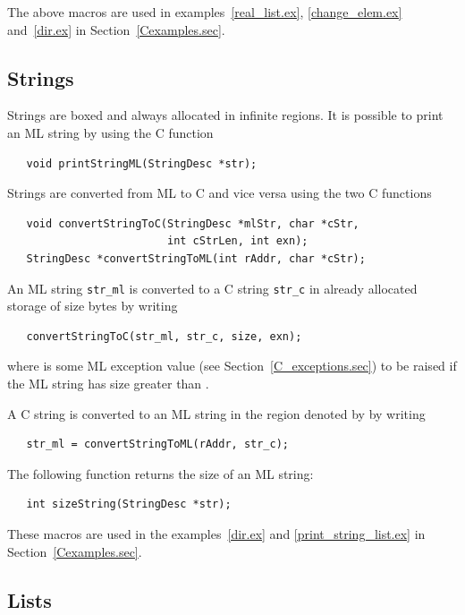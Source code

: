 \documentclass[12pt]{book}
\begin{document}
The above macros are used in examples~\ref{real_list.ex},
\ref{change_elem.ex} and~\ref{dir.ex} in Section~\ref{Cexamples.sec}.

\subsection{Strings}
Strings are boxed and always allocated in infinite regions. It is possible
to print an ML string by using the C function
%
\begin{verbatim}
   void printStringML(StringDesc *str);
\end{verbatim}

Strings are converted from ML to C and vice versa using the two C 
functions
%
%
\begin{verbatim}
   void convertStringToC(StringDesc *mlStr, char *cStr, 
                         int cStrLen, int exn);
   StringDesc *convertStringToML(int rAddr, char *cStr);
\end{verbatim}
An ML string \verb|str_ml| is converted to a C
string \verb|str_c| in already allocated storage of size  bytes by writing
\begin{verbatim}
   convertStringToC(str_ml, str_c, size, exn);
\end{verbatim}
where  is some ML exception value (see
Section~\ref{C_exceptions.sec}) to be raised if the ML string has size
greater than .  

A C string is converted to an ML string in the region denoted by
 by writing
\begin{verbatim}
   str_ml = convertStringToML(rAddr, str_c);
\end{verbatim}

The following function returns the size of an ML string:
%
\begin{verbatim}
   int sizeString(StringDesc *str);
\end{verbatim}

These macros are used in the examples~\ref{dir.ex} and
\ref{print_string_list.ex} in Section~\ref{Cexamples.sec}.

\subsection{Lists}
\end{document}
